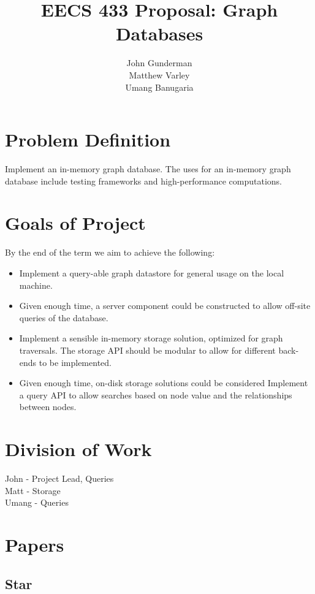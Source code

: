 \documentclass[11pt]{article}
\title{EECS 433 Proposal: Graph Databases}
\author{John Gunderman\\
		Matthew Varley\\
		Umang Banugaria}
\date{}
\begin{document}
\maketitle
\tableofcontents

\section{Problem Definition}
Implement an in-memory graph database. The uses for an in-memory graph database include testing frameworks and high-performance computations.

\section{Goals of Project}
By the end of the term we aim to achieve the following:

\begin{itemize}
\item Implement a query-able graph datastore for general usage on the local machine.
\item Given enough time, a server component could be constructed to allow off-site queries of the database.
\item Implement a sensible in-memory storage solution, optimized for graph traversals. The storage API should be modular to allow for different back-ends to be implemented.
\item Given enough time, on-disk storage solutions could be considered
Implement a query API to allow searches based on node value and the relationships between nodes.
\end{itemize}

\section{Division of Work}

John - Project Lead, Queries \\
Matt - Storage \\
Umang -  Queries \\

\section{Papers}

\subsection{Star}
\end{document}
